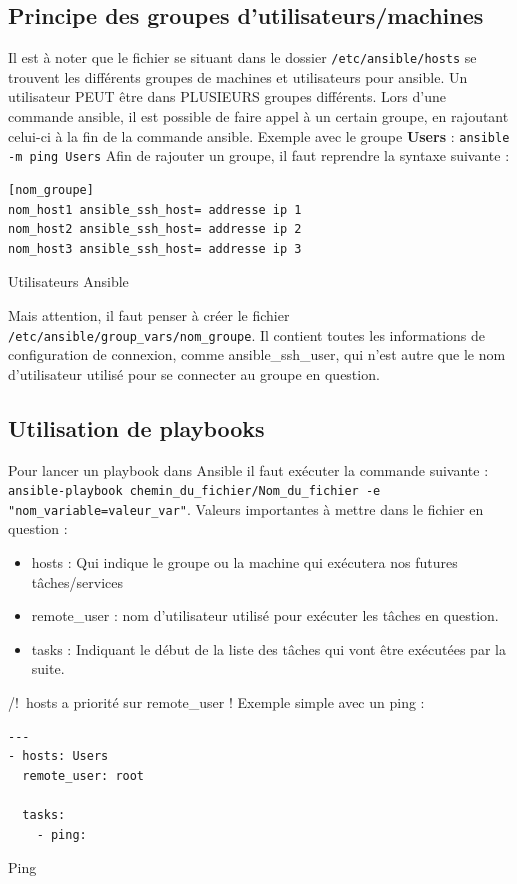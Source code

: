 \documentclass[a4paper, 12pt]{article}
\newenvironment{code}{\captionsetup{type=listing}}{}
\begin{document}
\subsection{Principe des groupes d'utilisateurs/machines}
Il est à noter que le fichier se situant dans le dossier \texttt{/etc/ansible/hosts} se trouvent les
différents groupes de machines et utilisateurs pour ansible.
Un utilisateur PEUT être dans PLUSIEURS groupes différents. Lors d'une commande ansible, il est possible de faire
appel à un certain groupe, en rajoutant celui-ci à la fin de la commande ansible.
Exemple avec le groupe \textbf{Users} : \texttt{ansible -m ping Users}
\bigbreak
Afin de rajouter un groupe, il faut reprendre la syntaxe suivante :
\begin{code}
    \begin{verbatim}
[nom_groupe]
nom_host1 ansible_ssh_host= addresse ip 1
nom_host2 ansible_ssh_host= addresse ip 2
nom_host3 ansible_ssh_host= addresse ip 3
    \end{verbatim}
    \caption{Utilisateurs Ansible}
    \label{Utilisateurs_ansible}
\end{code}
\bigbreak
Mais attention, il faut penser à créer le fichier \texttt{/etc/ansible/group_vars/nom_groupe}.
Il contient toutes les informations de configuration de connexion, comme ansible\_ssh\_user, qui n'est autre
que le nom d'utilisateur utilisé pour se connecter au groupe en question.



\subsection{Utilisation de playbooks}
Pour lancer un playbook dans Ansible il faut exécuter la commande suivante :
\\
\texttt{ansible-playbook chemin_du_fichier/Nom_du_fichier -e "nom_variable=valeur_var"}.
\bigbreak
Valeurs importantes à mettre dans le fichier en question :
\begin{itemize}
    \item hosts : Qui indique  le groupe ou la machine qui exécutera nos futures tâches/services
    \item remote\_user : nom d'utilisateur utilisé pour exécuter les tâches en question.
    \item tasks : Indiquant le début de la liste des tâches qui vont être exécutées par la suite.
\end{itemize}
/!\ hosts a priorité sur remote\_user !
\bigbreak
Exemple simple avec un ping :
\begin{code}
    \begin{verbatim}
---
- hosts: Users
  remote_user: root

  tasks:
    - ping:
    \end{verbatim}
    \caption{Ping}
    \label{Ping}
\end{code}
\bigbreak
\end{document}

